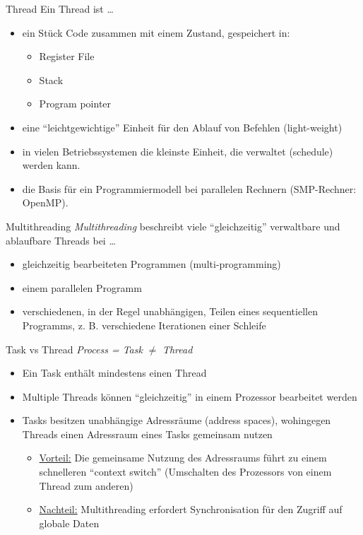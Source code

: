 \begin{defi}{Thread}
    Ein Thread ist \ldots
    \begin{itemize}[\ldots]
        \item ein Stück Code zusammen mit einem Zustand,
              gespeichert in:
              \begin{itemize}
                  \item Register File
                  \item Stack
                  \item Program pointer
              \end{itemize}
        \item eine \enquote{leichtgewichtige} Einheit für den Ablauf von Befehlen (light-weight)
        \item in vielen Betriebssystemen die kleinste Einheit,
              die verwaltet (schedule) werden kann.
        \item die Basis für ein Programmiermodell bei parallelen Rechnern (SMP-Rechner: OpenMP).
    \end{itemize}
\end{defi}

\begin{defi}{Multithreading}
    \emph{Multithreading} beschreibt viele \enquote{gleichzeitig} verwaltbare und ablaufbare Threads bei \ldots
    \begin{itemize}[\ldots]
        \item gleichzeitig bearbeiteten Programmen (multi-programming)
        \item einem parallelen Programm
        \item verschiedenen, in der Regel unabhängigen, Teilen eines sequentiellen Programms,
              z. B. verschiedene Iterationen einer Schleife
    \end{itemize}
\end{defi}

\begin{defi}{Task vs Thread}
    \emph{Process = Task} $\neq$ \emph{Thread}
    \begin{itemize}
        \item Ein Task enthält mindestens einen Thread
        \item Multiple Threads können \enquote{gleichzeitig} in einem Prozessor bearbeitet werden
        \item Tasks besitzen unabhängige Adressräume (address spaces),
              wohingegen Threads einen Adressraum eines Tasks gemeinsam nutzen
              \begin{itemize}
                  \item \underline{Vorteil:} Die gemeinsame Nutzung des Adressraums führt zu einem schnelleren \enquote{context switch}
                        (Umschalten des Prozessors von einem Thread zum anderen)
                  \item \underline{Nachteil:} Multithreading erfordert Synchronisation für den Zugriff auf globale Daten
              \end{itemize}
    \end{itemize}
\end{defi}

